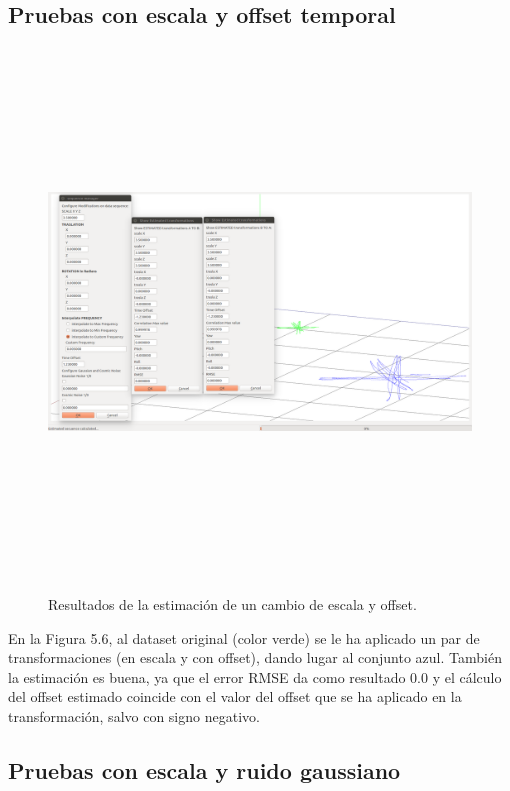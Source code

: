 \subsection{Pruebas con escala y offset temporal}
\begin{figure}[H]
\begin{center}
\label{fig:opciones de View}\includegraphics[height=14.0cm,width=18.0cm]{img/cap6/Escala_Offset_abba.png}
\hspace{0.5cm}

\end{center}

\caption{Resultados de la estimación de un cambio de escala y offset.}
\end{figure}

En la Figura 5.6, al dataset original (color verde) se le ha aplicado un par de transformaciones (en escala y con offset), dando lugar al conjunto azul. También la estimación es buena, ya que el error RMSE da como resultado 0.0 y el cálculo del offset estimado coincide con el valor del offset que se ha aplicado en la transformación, salvo con signo negativo.

\subsection{Pruebas con escala y ruido gaussiano}

